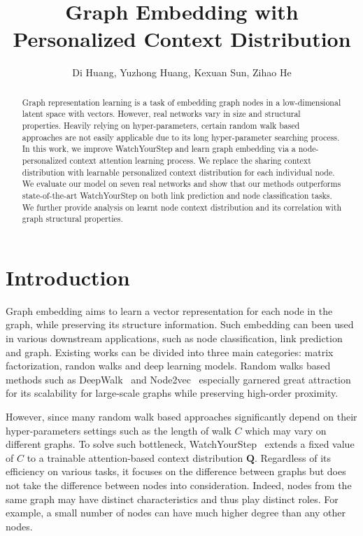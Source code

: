\documentclass{article}
\title{Graph Embedding with Personalized Context Distribution}
\author{
Di Huang, Yuzhong Huang, Kexuan Sun, Zihao He}
\begin{document}
\maketitle

\begin{abstract}
Graph representation learning is a task of embedding graph nodes in a low-dimensional latent space with vectors. 
However, real networks vary in size and structural properties. Heavily relying on hyper-parameters, certain random walk based approaches are not easily applicable due to its long hyper-parameter searching process. In this work, we improve WatchYourStep and learn graph embedding via a node-personalized context attention learning process. We replace the sharing context distribution with learnable personalized context distribution for each individual node. We evaluate our model on seven real networks and show that our methods outperforms state-of-the-art WatchYourStep on both link prediction and node classification tasks. We further provide analysis on learnt node context distribution and its correlation with graph structural properties.
\end{abstract}

\section{Introduction}

Graph embedding aims to learn a vector representation for each node in the graph, while preserving its structure information. Such embedding can been used in various downstream applications, such as node classification, link prediction and graph. Existing works can be divided into three main categories\cite{goyal2018graph}: matrix factorization, randon walks and deep learning models. Random walks based methods such as DeepWalk~\cite{perozzi2014deepwalk} and Node2vec~\cite{grover2016node2vec} especially garnered great attraction for its scalability for large-scale graphs while preserving high-order proximity.

However, since many random walk based approaches significantly depend on their hyper-parameters settings such as the length of walk $C$ which may vary on different graphs. To solve such bottleneck, WatchYourStep~\cite{abu2018watch} extends a fixed value of $C$ to a trainable attention-based context distribution $\mathbf{Q}$. Regardless of its efficiency on various tasks, it focuses on the difference between graphs but does not take the difference between nodes into consideration. Indeed, nodes from the same graph may have distinct characteristics and thus play distinct roles. For example, a small number of nodes can have much higher degree than any other nodes.
\end{document}
